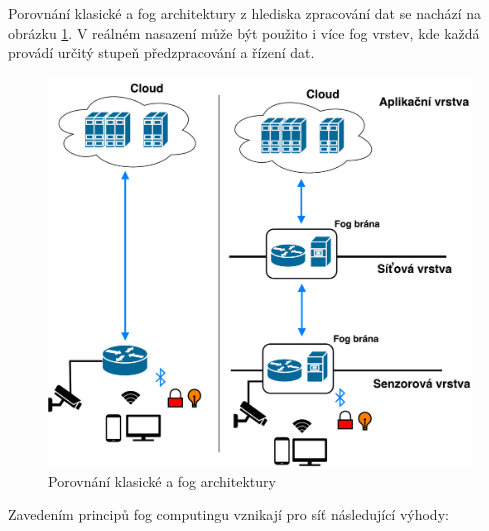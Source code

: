  Porovnání klasické a fog architektury z hlediska zpracování dat se nachází
 na obrázku \ref{obr.fog}. V reálném nasazení může
 být použito i více fog vrstev, kde každá provádí určitý stupeň předzpracování a řízení
 dat.
\begin{figure}[ht]
\begin{center}
\includegraphics[scale=0.45]{pictures/fog-arch}
\caption{Porovnání klasické a fog architektury}
\label{obr.fog}
\end{center}
\end{figure}
 Zavedením principů fog computingu vznikají pro síť následující výhody:
